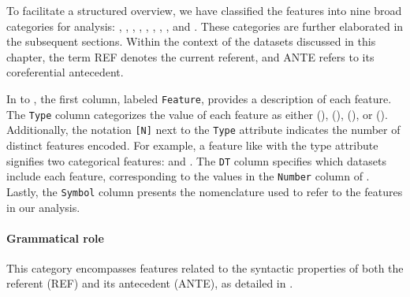 To facilitate a structured overview, we have classified the features into nine broad categories for analysis:  ,  ,  , , ,  ,  , , and . These categories are further elaborated in the subsequent sections. Within the context of the datasets discussed in this chapter, the term REF denotes the current referent, and ANTE refers to its coreferential antecedent.

\largerpage
In  to , the first column, labeled \texttt{Feature}, provides a description of each feature. The \texttt{Type} column categorizes the value of each feature as either  (),  (),  (), or  (). Additionally, the notation \texttt{[N]} next to the \texttt{Type} attribute indicates the number of distinct features encoded. For example, a feature like  with the type attribute  signifies two categorical features:  and .
The \texttt{DT} column specifies which datasets include each feature, corresponding to the values in the \texttt{Number} column of . Lastly, the \texttt{Symbol} column presents the nomenclature used to refer to the features in our analysis.

\paragraph*{Grammatical role} 
This category encompasses features related to the syntactic properties of both the referent (REF) and its antecedent (ANTE), as detailed in .

